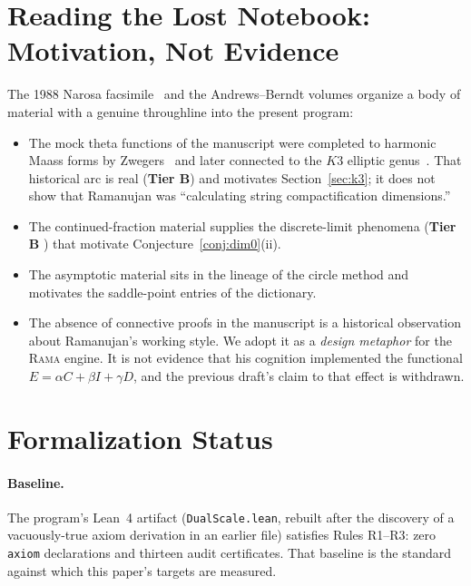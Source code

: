 \documentclass[11pt,a4paper]{article}
\theoremstyle{plain}
\theoremstyle{definition}
\theoremstyle{remark}
\newcommand{\tierB}{\textbf{Tier B}}
\begin{document}
\section{Reading the Lost Notebook: Motivation, Not Evidence}
\label{sec:lostnotebook}

The 1988 Narosa facsimile~\cite{Narosa1988} and the Andrews--Berndt volumes
\cite{AndrewsBerndt} organize a body of material with a genuine throughline
into the present program:

\begin{itemize}
\item The mock theta functions of the manuscript were completed to harmonic
Maass forms by Zwegers~\cite{Zwegers2002} and later connected to the $K3$
elliptic genus~\cite{EOT2011,Gannon2016}. That historical arc is real
(\tierB{}) and motivates Section~\ref{sec:k3}; it does not show that
Ramanujan was ``calculating string compactification dimensions.''
\item The continued-fraction material supplies the discrete-limit phenomena
(\tierB{} \cite{BowmanMcLaughlin2004,AndrewsBerndt}) that motivate Conjecture~\ref{conj:dim0}(ii).
\item The asymptotic material sits in the lineage of the circle method and
motivates the saddle-point entries of the dictionary.
\item The absence of connective proofs in the manuscript is a historical
observation about Ramanujan's working style. We adopt it as a \emph{design
metaphor} for the \textsc{Rama} engine. It is not evidence that his
cognition implemented the functional $E=\alpha C+\beta I+\gamma D$, and the
previous draft's claim to that effect is withdrawn.
\end{itemize}

\section{Formalization Status}\label{sec:lean}

\paragraph{Baseline.} The program's Lean~4 artifact
(\texttt{DualScale.lean}, rebuilt after the discovery of a vacuously-true
axiom derivation in an earlier file) satisfies Rules R1--R3: zero
\texttt{axiom} declarations and thirteen audit certificates. That baseline
is the standard against which this paper's targets are measured.
\end{document}
